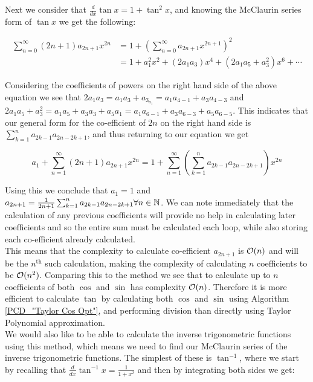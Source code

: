 {Next we consider that \(\frac{d}{dx} \tan x = 1 + \tan^2 x\), and knowing the McClaurin series form of \(\tan x\) we get the following:

\begin{displaymath}
\begin{align*}
	\sum_{n=0}^\infty (2n+1)a_{2n+1}x^{2n} &= 1 + 
		(\sum_{n=0}^\infty a_{2n+1}x^{2n+1})^2\\
	&= 1 + a_1^2x^2 + (2a_1a_3)x^4 + (2a_1a_5 + a_3^2)x^6 + \cdots
\end{align*}
\end{displaymath}

Considering the coefficients of powers on the right hand side of the above equation we see that \(2a_1a_3 = a_1a_3 + a_3_a_1 = a_1a_{4-1} + a_3a_{4-3}\) and \(2a_1a_5 + a_3^2 = a_1a_5 + a_3a_3 + a_5a_1 = a_1a_{6-1} + a_3a_{6-3} +a_5a_{6-5}\). This indicates that our general form for the co-efficient of \(2n\) on the right hand side is \(\sum_{k=1}^n a_{2k-1}a_{2n - 2k + 1}\), and thus returning to our equation we get

\[a_1 + \sum_{n=1}^\infty (2n+1)a_{2n+1}x^{2n} = 1 + \sum_{n=1}^\infty(\sum_{k=1}^n a_{2k-1}a_{2n-2k+1})x^{2n}\]

Using this we conclude that \(a_1 = 1\) and \(a_{2n+1} = \frac{1}{2n+1}\sum_{k=1}^n a_{2k-1}a_{2n-2k+1} \forall n \in \mathbb{N}\). We can note immediately that the calculation of any previous coefficients will provide no help in calculating later coefficients and so the entire sum must be calculated each loop, while also storing each co-efficient already calculated.\\

This means that the complexity to calculate co-efficient \(a_{2n+1}\) is \(\mathcal{O}(n)\) and will be the \(n^\text{th}\) such calculation, making the complexity of calculating \(n\) coefficients to be \(\mathcal{O}(n^2)\). Comparing this to the  method we see that to calculate up to \(n\) coefficients of both \(\cos\) and \(\sin\) has complexity \(\mathcal{O}(n)\). Therefore it is more efficient to calculate \(\tan\) by calculating both \(\cos\) and \(\sin\) using Algorithm \ref{PCD_"Taylor Cos Opt"}, and performing division than directly using Taylor Polynomial approximation.\\

We would also like to be able to calculate the inverse trigonometric functions using this method, which means we need to find our McClaurin series of the inverse trigonometric functions. The simplest of these is \(\tan^{-1}\), where we start by recalling that \(\frac{d}{dx} \tan^{-1} x = \frac{1}{1+x^2}\) and then by integrating both sides we get:

}
